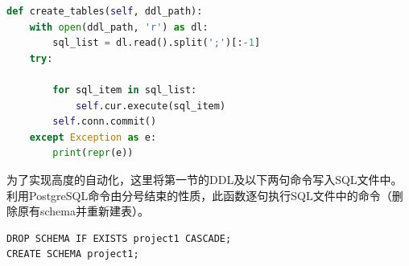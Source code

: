 \begin{lstlisting}[language=python]
def create_tables(self, ddl_path):
    with open(ddl_path, 'r') as dl:
        sql_list = dl.read().split(';')[:-1]
    try:

        for sql_item in sql_list:
            self.cur.execute(sql_item)
        self.conn.commit()
    except Exception as e:
        print(repr(e))
\end{lstlisting}
\vspace{-3em}\par
为了实现高度的自动化，这里将第一节的DDL及以下两句命令写入SQL文件中。利用PostgreSQL命令由分号结束的性质，此函数逐句执行SQL文件中的命令（删除原有schema并重新建表）。

\begin{lstlisting}
DROP SCHEMA IF EXISTS project1 CASCADE;
CREATE SCHEMA project1;
\end{lstlisting}

